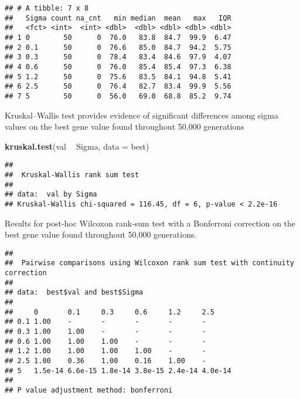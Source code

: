 \documentclass[]{book}
\newenvironment{Shaded}{\begin{snugshade}}{\end{snugshade}}
\newcommand{\DataTypeTok}[1]{\textcolor[rgb]{0.13,0.29,0.53}{#1}}
\newcommand{\KeywordTok}[1]{\textcolor[rgb]{0.13,0.29,0.53}{\textbf{#1}}}
\newcommand{\NormalTok}[1]{#1}
\newcommand{\OperatorTok}[1]{\textcolor[rgb]{0.81,0.36,0.00}{\textbf{#1}}}
\newcommand{\OtherTok}[1]{\textcolor[rgb]{0.56,0.35,0.01}{#1}}
\newcommand{\StringTok}[1]{\textcolor[rgb]{0.31,0.60,0.02}{#1}}
\begin{document}
\begin{verbatim}
## # A tibble: 7 x 8
##   Sigma count na_cnt   min median  mean   max   IQR
##   <fct> <int>  <int> <dbl>  <dbl> <dbl> <dbl> <dbl>
## 1 0        50      0  76.0   83.8  84.7  99.9  6.47
## 2 0.1      50      0  76.6   85.0  84.7  94.2  5.75
## 3 0.3      50      0  78.4   83.4  84.6  97.9  4.07
## 4 0.6      50      0  76.0   85.4  85.4  97.3  6.38
## 5 1.2      50      0  75.6   83.5  84.1  94.8  5.41
## 6 2.5      50      0  76.4   82.7  83.4  99.9  5.56
## 7 5        50      0  56.0   69.0  68.8  85.2  9.74
\end{verbatim}

Kruskal--Wallis test provides evidence of significant differences among sigma values on the best gene value found throughout 50,000 generations

\begin{Shaded}
\begin{Highlighting}[]
\KeywordTok{kruskal.test}\NormalTok{(val }\OperatorTok{~}\StringTok{ }\NormalTok{Sigma, }\DataTypeTok{data =}\NormalTok{ best)}
\end{Highlighting}
\end{Shaded}

\begin{verbatim}
## 
##  Kruskal-Wallis rank sum test
## 
## data:  val by Sigma
## Kruskal-Wallis chi-squared = 116.45, df = 6, p-value < 2.2e-16
\end{verbatim}

Results for post-hoc Wilcoxon rank-sum test with a Bonferroni correction on the best gene value found throughout 50,000 generations.

\begin{Shaded}
\end{Shaded}

\begin{verbatim}
## 
##  Pairwise comparisons using Wilcoxon rank sum test with continuity correction 
## 
## data:  best$val and best$Sigma 
## 
##     0       0.1     0.3     0.6     1.2     2.5    
## 0.1 1.00    -       -       -       -       -      
## 0.3 1.00    1.00    -       -       -       -      
## 0.6 1.00    1.00    1.00    -       -       -      
## 1.2 1.00    1.00    1.00    1.00    -       -      
## 2.5 1.00    0.36    1.00    0.16    1.00    -      
## 5   1.5e-14 6.6e-15 1.8e-14 3.8e-15 2.4e-14 4.0e-14
## 
## P value adjustment method: bonferroni
\end{verbatim}
\end{document}
